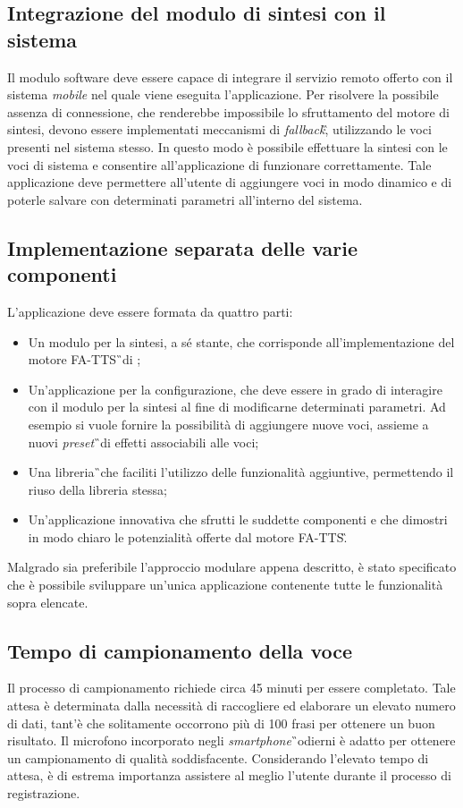 \subsection{Integrazione del modulo di sintesi con il sistema}
Il modulo software deve essere capace di integrare il servizio remoto offerto 
con il sistema \textit{mobile} nel quale viene eseguita l'applicazione. Per 
risolvere la possibile assenza di connessione, che renderebbe impossibile lo 
sfruttamento del motore di sintesi, devono essere implementati meccanismi di 
\textit{fallback}\G, utilizzando le voci presenti nel sistema stesso. In questo 
modo è possibile effettuare la sintesi con le voci di sistema e consentire 
all'applicazione di funzionare correttamente. Tale applicazione deve permettere 
all'utente di aggiungere voci in modo dinamico e di poterle salvare con 
determinati parametri all'interno del sistema.

\subsection{Implementazione separata delle varie componenti}
L'applicazione deve essere formata da quattro parti:
\begin{itemize}
	\item Un modulo per la sintesi, a sé stante, che corrisponde 
	all'implementazione del motore FA-TTS\G\ di \AZIENDA;
	\item Un'applicazione per la configurazione, che deve essere in grado di 
	interagire con il modulo per la sintesi al fine di modificarne determinati 
	parametri. Ad esempio si vuole fornire la possibilità di aggiungere nuove 
	voci, assieme a nuovi \textit{preset}\G\ di effetti associabili alle voci;
	\item Una libreria\G\ che faciliti l'utilizzo delle funzionalità 
	aggiuntive, permettendo il riuso della libreria stessa;
	\item Un'applicazione innovativa che sfrutti le suddette componenti e che dimostri in modo chiaro le potenzialità offerte dal motore FA-TTS\G.
\end{itemize}
Malgrado sia preferibile l'approccio modulare appena descritto, è stato specificato che è possibile sviluppare un'unica applicazione contenente tutte le funzionalità sopra elencate. 

\subsection{Tempo di campionamento della voce}
Il processo di campionamento richiede circa 45 minuti per essere completato. Tale attesa è determinata dalla necessità di raccogliere ed elaborare un elevato numero di dati, tant'è che solitamente occorrono più di 100 frasi per ottenere un buon risultato. Il microfono incorporato negli \textit{smartphone}\G\ odierni è adatto per ottenere un campionamento di qualità soddisfacente. Considerando l'elevato tempo di attesa, è di estrema importanza  assistere al meglio l'utente durante il processo di registrazione.

